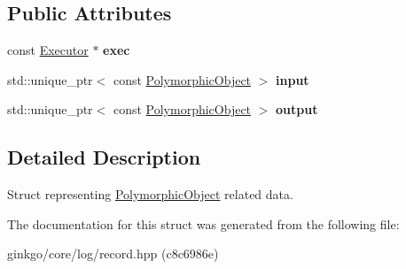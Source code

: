 \subsection*{Public Attributes}
\begin{DoxyCompactItemize}
\item 
\mbox{\label{structgko_1_1log_1_1polymorphic__object__data_a673a2c661ae7c582475d044cf37a8ec2}} 
const \hyperlink{classgko_1_1Executor}{Executor} $\ast$ {\bfseries exec}
\item 
\mbox{\label{structgko_1_1log_1_1polymorphic__object__data_a835d796a090caae61492e27e657e09d8}} 
std\+::unique\+\_\+ptr$<$ const \hyperlink{classgko_1_1PolymorphicObject}{Polymorphic\+Object} $>$ {\bfseries input}
\item 
\mbox{\label{structgko_1_1log_1_1polymorphic__object__data_a47d7c908e465c205de05fc7e4aac7613}} 
std\+::unique\+\_\+ptr$<$ const \hyperlink{classgko_1_1PolymorphicObject}{Polymorphic\+Object} $>$ {\bfseries output}
\end{DoxyCompactItemize}


\subsection{Detailed Description}
Struct representing \hyperlink{classgko_1_1PolymorphicObject}{Polymorphic\+Object} related data. 

The documentation for this struct was generated from the following file\+:\begin{DoxyCompactItemize}
\item 
ginkgo/core/log/record.\+hpp (c8c6986e)\end{DoxyCompactItemize}
